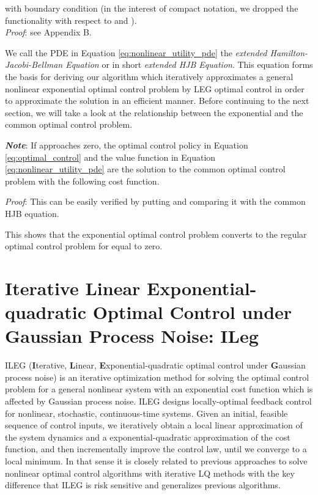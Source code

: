 \documentclass[letterpaper, 10 pt, conference]{ieeeconf}
\begin{document}
with boundary condition  (in the interest
of compact notation, we dropped the functionality with respect to  and ). \\
\textit{Proof}: see Appendix B.

We call the PDE in Equation \eqref{eq:nonlinear_utility_pde} the \emph{extended
Hamilton-Jacobi-Bellman Equation} or in short \emph{extended HJB Equation}.
This equation forms the basis for deriving our algorithm which iteratively
approximates a general nonlinear exponential optimal control problem by LEG
optimal control  in order to approximate the solution in an efficient manner.
Before continuing to the next section, we will take a look at the relationship
between the exponential and the common optimal control problem.

\textbf{\textit{Note}}: If  approaches zero, the optimal control
policy in Equation \eqref{eq:optimal_control} and the value function in Equation
\eqref{eq:nonlinear_utility_pde} are the solution to the common optimal control
problem with the following cost function.

\textit{Proof}: This can be easily verified by putting  and comparing
it with the common HJB equation.

This shows that the exponential optimal control problem converts to the regular
optimal control problem for  equal to zero.


\section{Iterative Linear Exponential-quadratic Optimal Control under Gaussian Process Noise: ILeg} \label{sec:continuous_ILEQG}
ILEG (\textbf{I}terative, \textbf{L}inear, \textbf{E}xponential-quadratic optimal
control under \textbf{G}aussian process noise) is an iterative optimization
method for solving the optimal control problem for a general nonlinear system
with an exponential cost function which is affected by Gaussian process noise.
ILEG designs locally-optimal feedback control for nonlinear, stochastic,
continuous-time systems. Given an initial, feasible sequence of control inputs,
we iteratively obtain a local linear approximation of the system dynamics and a
exponential-quadratic approximation of the cost function, and then incrementally
improve the control law, until we converge to a local minimum. In that sense it
is closely related to previous approaches to solve nonlinear optimal control
algorithms with iterative LQ methods \cite{sideris05,todorov05} with the key
difference that ILEG is risk sensitive and generalizes previous algorithms.
\end{document}
